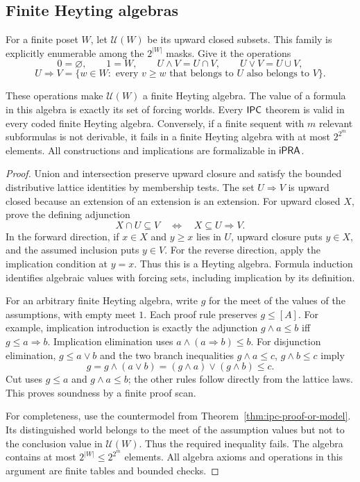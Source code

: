 \subsection{Finite Heyting algebras}

For a finite poset $W$, let $\mathcal U(W)$ be its upward closed subsets.
This family is explicitly enumerable among the $2^{|W|}$ masks. Give it
the operations
\[
0=\varnothing,\qquad 1=W,\qquad
U\mathbin{\wedge}V=U\cap V,\qquad
U\mathbin{\vee}V=U\cup V,
\]
\[
U\Rightarrow V=
\{w\in W:\text{ every }v\geq w\text{ that belongs to }U
                              \text{ also belongs to }V\}.
\]

\begin{theorem}
\label{thm:ipc-heyting}
These operations make $\mathcal U(W)$ a finite Heyting algebra. The value
of a formula in this algebra is exactly its set of forcing worlds. Every
$\mathsf{IPC}$ theorem is valid in every coded finite Heyting algebra. Conversely,
if a finite sequent with $m$ relevant subformulas is not derivable, it fails
in a finite Heyting algebra with at most $2^{2^m}$ elements. All constructions
and implications are formalizable in $\mathsf{iPRA}$.
\end{theorem}
\begin{proof}
Union and intersection preserve upward closure and satisfy the bounded
distributive lattice identities by membership tests. The set $U\Rightarrow V$
is upward closed because an extension of an extension is an extension.
For upward closed $X$, prove the defining adjunction
\[
             X\cap U\subseteq V
             \quad\Longleftrightarrow\quad
             X\subseteq U\Rightarrow V.
\]
In the forward direction, if $x\in X$ and $y\geq x$ lies in $U$, upward
closure puts $y\in X$, and the assumed inclusion puts $y\in V$.
For the reverse direction, apply the implication condition at $y=x$.
Thus this is a Heyting algebra. Formula induction identifies algebraic
values with forcing sets, including implication by its definition.

For an arbitrary finite Heyting algebra, write $g$ for the meet of the
values of the assumptions, with empty meet $1$. Each proof rule preserves
$g\leq[A]$. For example, implication introduction is exactly the adjunction
$g\wedge a\leq b$ iff $g\leq a\Rightarrow b$.
Implication elimination uses $a\wedge(a\Rightarrow b)\leq b$.
For disjunction elimination, $g\leq a\vee b$ and the two branch inequalities
$g\wedge a\leq c$, $g\wedge b\leq c$ imply
\[
g=g\wedge(a\vee b)=(g\wedge a)\vee(g\wedge b)\leq c.
\]
Cut uses $g\leq a$ and $g\wedge a\leq b$; the other rules follow directly
from the lattice laws. This proves soundness by a finite proof scan.

For completeness, use the countermodel from
Theorem~\ref{thm:ipc-proof-or-model}. Its distinguished world belongs to
the meet of the assumption values but not to the conclusion value in
$\mathcal U(W)$. Thus the required inequality fails. The algebra contains
at most $2^{|W|}\leq2^{2^m}$ elements. All algebra axioms and operations
in this argument are finite tables and bounded checks.
\end{proof}

